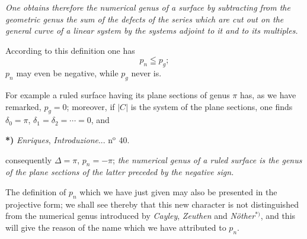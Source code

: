 \documentclass{article}
\begin{document}
\emph{One obtains therefore the numerical genus of a surface by subtracting from the geometric genus the sum of the defects of the series which are cut out on the general curve of a linear system by the systems adjoint to it and to its multiples.}

According to this definition one has
\[
p_{n} \leqq p_{g};
\]
$p_{n}$ may even be negative, while $p_{g}$ never is.

For example a ruled surface having its plane sections of genus $\pi$ has, as we have remarked, $p_{g} = 0$; moreover, if $|C|$ is the system of the plane sections, one finds $\delta_{0} = \pi$, $\delta_{1} = \delta_{2} = \cdots = 0$, and

\textbf{*)} \emph{Enriques}, \emph{Introduzione}... n${}^{\text{o}}$ 40.

consequently $\Delta = \pi$, $p_{n} = -\pi$; \emph{the numerical genus of a ruled surface is the genus of the plane sections of the latter preceded by the negative sign.}

The definition of $p_{n}$ which we have just given may also be presented in the projective form; we shall see thereby that this new character is not distinguished from the numerical genus introduced by \emph{Cayley}, \emph{Zeuthen} and \emph{Nöther}${}^{*)}$, and this will give the reason of the name which we have attributed to $p_{n}$.
\end{document}
